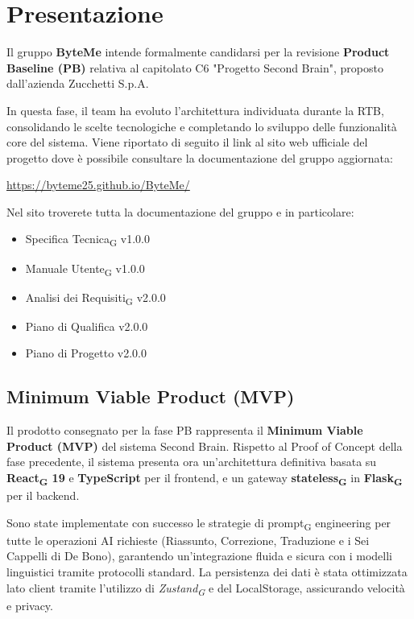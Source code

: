 \documentclass[11pt,a4paper]{article}
\newcommand{\gls}[1]{#1\textsubscript{G}}
\begin{document}
\section{Presentazione}
Il gruppo \textbf{ByteMe} intende formalmente candidarsi per la revisione \textbf{Product Baseline (PB)} relativa al capitolato C6 "Progetto Second Brain", proposto dall'azienda Zucchetti S.p.A.

In questa fase, il team ha evoluto l'architettura individuata durante la RTB, consolidando le scelte tecnologiche e completando lo sviluppo delle funzionalità core del sistema. Viene riportato di seguito il link al sito web ufficiale del progetto dove è possibile consultare la documentazione del gruppo aggiornata:
\begin{center}
    \url{https://byteme25.github.io/ByteMe/}
\end{center}

\noindent Nel sito troverete tutta la documentazione del gruppo e in particolare:
\begin{itemize}
    \item {\gls{Specifica Tecnica} v1.0.0}
    \item {\gls{Manuale Utente} v1.0.0}
    \item {\gls{Analisi dei Requisiti} v2.0.0}
    \item {Piano di Qualifica v2.0.0}
    \item {Piano di Progetto v2.0.0}
\end{itemize}


\subsection{Minimum Viable Product (MVP)}
Il prodotto consegnato per la fase PB rappresenta il \textbf{Minimum Viable Product (MVP)} del sistema Second Brain. Rispetto al Proof of Concept della fase precedente, il sistema presenta ora un'architettura definitiva basata su \textbf{\gls{React} 19} e \textbf{TypeScript} per il frontend, e un gateway \textbf{\gls{stateless}} in \textbf{\gls{Flask}} per il backend. 

Sono state implementate con successo le strategie di \gls{prompt} engineering per tutte le operazioni AI richieste (Riassunto, Correzione, Traduzione e i Sei Cappelli di De Bono), garantendo un'integrazione fluida e sicura con i modelli linguistici tramite protocolli standard. La persistenza dei dati è stata ottimizzata lato client tramite l'utilizzo di \textit{\gls{Zustand}} e del LocalStorage, assicurando velocità e privacy.
\end{document}
